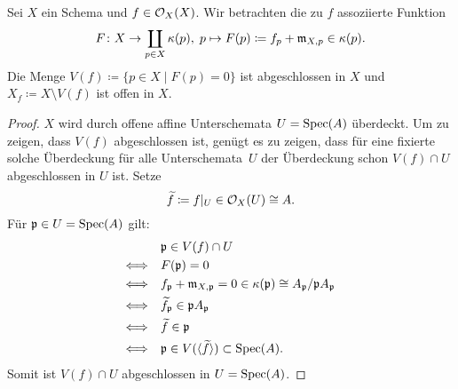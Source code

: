 \begin{lem}
\label{lem:6.4}
	Sei $X$ ein Schema und $f \in \mathcal{O}_X(X)$. Wir betrachten die zu $f$ assoziierte Funktion
	\[
		F\colon X \to \coprod_{p \in X}\kappa(p),\; p \mapsto F(p)\coloneqq f_p+\mathfrak{m}_{X,p}\in \kappa(p).
	\]
	Die Menge $V(f) \coloneqq \{p\in X\mid F(p) = 0\}$ ist abgeschlossen in $X$ und $X_f\coloneqq X \setminus V(f)$ ist offen in $X$.
	\begin{proof}
		$X$ wird durch offene affine Unterschemata $U=\operatorname{Spec}(A)$ überdeckt. Um zu zeigen, dass $V(f)$ abgeschlossen ist, genügt es zu zeigen, dass für eine fixierte solche Überdeckung für alle Unterschemata~$U$ der Überdeckung schon $V(f)\cap U$ abgeschlossen in $U$ ist. Setze
		\[
			\widetilde{f}\coloneqq f\vert_U\in \mathcal{O}_X(U) \cong A.
		\]
		Für $\mathfrak{p}\in U = \operatorname{Spec}(A)$ gilt:
		\begin{align*}
			&\mathfrak{p} \in V(f) \cap U\\
			\Longleftrightarrow \quad & F(\mathfrak{p})=0\\
			\Longleftrightarrow \quad & f_{\mathfrak{p}}+\mathfrak{m}_{X,\mathfrak{p}} = 0 \in \kappa(\mathfrak{p}) \cong A_{\mathfrak{p}}/\mathfrak{p} A_{\mathfrak{p}}\\
			\Longleftrightarrow \quad & \widetilde{f}_{\mathfrak{p}} \in \mathfrak{p} A_{\mathfrak{p}}\\
			\Longleftrightarrow \quad & \widetilde{f} \in \mathfrak{p}\\
			\Longleftrightarrow \quad & \mathfrak{p} \in V(\langle \widetilde{f} \rangle) \subset \operatorname{Spec}(A) .
		\end{align*}
		Somit ist $V(f)\cap U$ abgeschlossen in $U = \operatorname{Spec}(A)$.
	\end{proof}
\end{lem}

